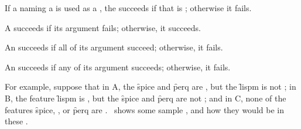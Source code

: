 If a  naming a  is used as a ,
the  succeeds if that  is ;
otherwise it fails.


A   succeeds 
if its argument  fails;
otherwise, it succeeds.


An   succeeds 
if all of its argument  succeed;
otherwise, it fails.


An   succeeds 
if any of its argument  succeeds;
otherwise, it fails.

\endlist

For example, suppose that
 in  A, the  \f{spice} and \f{perq} are ,
			     but the  \f{lispm} is not ;
 in  B, the feature \f{lispm} is ,
			     but the  \f{spice} and \f{perq} are
			      not ;
 and 
 in  C, none of the features \f{spice}, , or \f{perq} are
			     .
\Thenextfigure\ shows some sample , and how they would be 
 in these .

